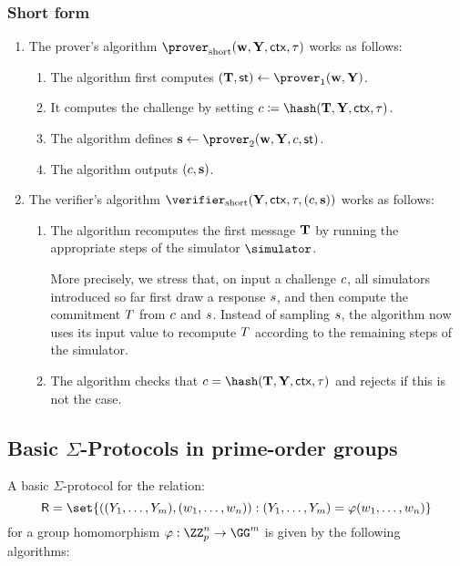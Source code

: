 \documentclass[runningheads,11pt]{article}
\begin{document}
\subsubsection{Short form}
\begin{enumerate}
  \item
    The prover's algorithm $\shortprover(\vec \witness, \vec \statement,\ctx, \stag)$ works as follows:
    \begin{enumerate}
      \item
        The algorithm first computes $(\vec \commitment,\st)\gets\prover_1(\vec \witness, \vec \statement)$.
      \item
        It computes the challenge by setting $c\defeq\hash(\vec \commitment, \vec \statement,\ctx, \stag)$.
      \item
        The algorithm defines $\vec \response\gets\prover_2(\vec \witness,\vec \statement, \challenge,\st)$.
      \item
        The algorithm outputs $(c,\mathbf {s})$.
    \end{enumerate}
  \item
    The verifier's algorithm $\shortverifier(\vec \statement, \ctx, \stag, (\challenge, \vec \response))$ works as follows:
    \begin{enumerate}
      \item\label{item:fslong:v:recomputet}
        The algorithm recomputes the first message $\mathbf {T}$ by running the appropriate steps of the simulator $\simulator$.

         More precisely, we stress that, on input a challenge $c$, all simulators introduced so far first draw a response $s$, and then compute the commitment $T$ from $c$ and $s$.
        Instead of sampling $s$, the algorithm now uses its input value to recompute $T$ according to the remaining steps of the simulator.
        \item
        The algorithm checks that $c=\hash(\vec \commitment, \vec \statement, \ctx, \tau)$ and rejects if this is not the case.
    \end{enumerate}
\end{enumerate}



\subsection{Basic $\Sigma$-Protocols in prime-order groups}\label{sec:basicsigma}
A basic $\Sigma$-protocol for the relation:
\[
  \relation=\set{((\statement_1,\dots,\statement_m),(w_1,\dots,w_n)) : (\statement_1,\dots,\statement_m)=\varphi(w_1,\dots,w_n)}
\]
 for a group homomorphism $\varphi:\ZZ_p^n\to\GG^m$ is given by the following algorithms:
\end{document}
